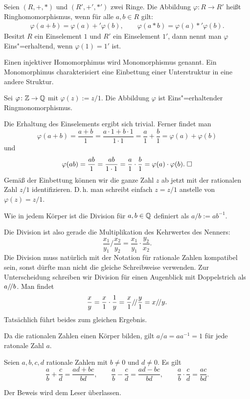 \newpage
\begin{Definition}[Ringhomomorphismus]
Seien $(R,+,*)$ und $(R',+',*')$ zwei Ringe. Die Abbildung
$\varphi\colon R\to R'$ heißt Ringhomomorphismus, wenn für alle
$a,b\in R$ gilt:
\begin{align*}
\varphi(a+b) = \varphi(a)+'\varphi(b),\qquad
\varphi(a*b) = \varphi(a)*'\varphi(b).
\end{align*}
Besitzt $R$ ein Einselement $1$ und $R'$ ein Einselement $1'$,
dann nennt man $\varphi$ Eins"=erhaltend, wenn $\varphi(1)=1'$ ist.
\end{Definition}
Einen injektiver Homomorphimus wird Monomorphismus genannt. Ein
Monomorphimus charakterisiert eine Einbettung einer Unterstruktur
in eine andere Struktur.
\begin{Satz}
Sei $\varphi\colon\mathbb Z\to\mathbb Q$ mit $\varphi(z):=z/1$. Die
Abbildung $\varphi$ ist Eins"=erhaltender Ringmonomorphismus.
\end{Satz}
 Die Erhaltung des Einselements ergibt sich
trivial. Ferner findet man
\[\varphi(a+b) = \frac{a+b}{1} = \frac{a\cdot 1+b\cdot 1}{1\cdot 1}
= \frac{a}{1}+\frac{b}{1} = \varphi(a)+\varphi(b)\]
und
\[\varphi(ab) = \frac{ab}{1} = \frac{ab}{1\cdot 1} = \frac{a}{1}\cdot\frac{b}{1}
= \varphi(a)\cdot\varphi(b).\;\Box\]
Gemäß der Einbettung können wir die ganze Zahl $z$ ab jetzt
mit der rationalen Zahl $z/1$ identifizieren. D.\,h. man schreibt
einfach $z=z/1$ anstelle von $\varphi(z)=z/1$.

\begin{Definition}
Wie in jedem Körper ist die Division für $a,b\in\mathbb Q$
definiert als $a/b := ab^{-1}$.
\end{Definition}
Die Division ist also gerade die Multiplikation des Kehrwertes
des Nenners:
\[\frac{x_1}{y_1}/\frac{x_2}{y_2} = \frac{x_1}{y_1}\cdot\frac{y_2}{x_2}.\]
Die Division muss natürlich mit der Notation für rationale Zahlen
kompatibel sein, sonst dürfte man nicht die gleiche Schreibweise
verwenden. Zur Unterscheidung schreiben wir Division für einen
Augenblick mit Doppelstrich als $a/\!/ b$. Man findet
\[\frac{x}{y} = \frac{x}{1}\cdot\frac{1}{y}
= \frac{x}{1}/\!/\frac{y}{1} = x/\!/ y.\]
Tatsächlich führt beides zum gleichen Ergebnis.

Da die rationalen Zahlen einen Körper bilden, gilt $a/a=aa^{-1}=1$
für jede ratonale Zahl $a$.

\begin{Satz}
Seien $a,b,c,d$ rationale Zahlen mit $b\ne 0$ und $d\ne 0$. Es gilt
\[\frac{a}{b}+\frac{c}{d} = \frac{ad+bc}{bd},
\qquad \frac{a}{b}-\frac{c}{d} = \frac{ad-bc}{bd},
\qquad \frac{a}{b}\cdot\frac{c}{d} = \frac{ac}{bd}.\]
\end{Satz}
Der Beweis wird dem Leser überlassen.

